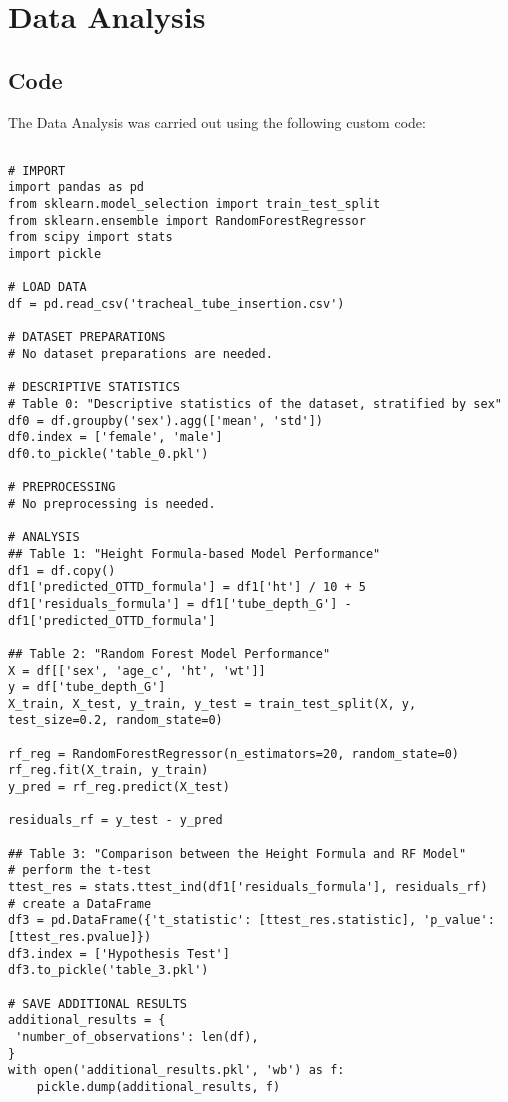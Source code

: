 \documentclass[11pt]{article}
\begin{document}
\section{Data Analysis}
\subsection{{Code}}
The Data Analysis was carried out using the following custom code:

\begin{verbatim}

# IMPORT
import pandas as pd
from sklearn.model_selection import train_test_split
from sklearn.ensemble import RandomForestRegressor
from scipy import stats
import pickle

# LOAD DATA
df = pd.read_csv('tracheal_tube_insertion.csv')

# DATASET PREPARATIONS
# No dataset preparations are needed.

# DESCRIPTIVE STATISTICS
# Table 0: "Descriptive statistics of the dataset, stratified by sex"
df0 = df.groupby('sex').agg(['mean', 'std'])
df0.index = ['female', 'male']
df0.to_pickle('table_0.pkl')

# PREPROCESSING 
# No preprocessing is needed.

# ANALYSIS
## Table 1: "Height Formula-based Model Performance"
df1 = df.copy()
df1['predicted_OTTD_formula'] = df1['ht'] / 10 + 5
df1['residuals_formula'] = df1['tube_depth_G'] - df1['predicted_OTTD_formula']

## Table 2: "Random Forest Model Performance"
X = df[['sex', 'age_c', 'ht', 'wt']]
y = df['tube_depth_G']
X_train, X_test, y_train, y_test = train_test_split(X, y, test_size=0.2, random_state=0) 

rf_reg = RandomForestRegressor(n_estimators=20, random_state=0) 
rf_reg.fit(X_train, y_train) 
y_pred = rf_reg.predict(X_test)

residuals_rf = y_test - y_pred

## Table 3: "Comparison between the Height Formula and RF Model"
# perform the t-test
ttest_res = stats.ttest_ind(df1['residuals_formula'], residuals_rf)
# create a DataFrame
df3 = pd.DataFrame({'t_statistic': [ttest_res.statistic], 'p_value': [ttest_res.pvalue]})
df3.index = ['Hypothesis Test']
df3.to_pickle('table_3.pkl')

# SAVE ADDITIONAL RESULTS
additional_results = {
 'number_of_observations': len(df),
}
with open('additional_results.pkl', 'wb') as f:
    pickle.dump(additional_results, f)

\end{verbatim}
\end{document}
